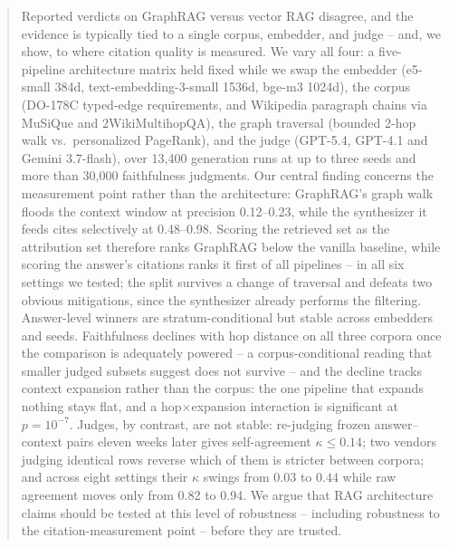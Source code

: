 \begin{abstract}
Reported verdicts on GraphRAG versus vector RAG disagree, and the
evidence is typically tied to a single corpus, embedder, and judge --
and, we show, to where citation quality is measured. We vary all four:
a five-pipeline architecture matrix held fixed while we swap the
embedder (e5-small 384d, text-embedding-3-small 1536d, bge-m3 1024d),
the corpus (DO-178C typed-edge requirements, and Wikipedia paragraph
chains via MuSiQue and 2WikiMultihopQA), the graph traversal (bounded
2-hop walk vs.\ personalized PageRank), and the judge (GPT-5.4, GPT-4.1
and Gemini 3.7-flash), over 13{,}400 generation runs at up to three
seeds and more than 30{,}000 faithfulness judgments. Our central finding concerns
the measurement point rather than the architecture: GraphRAG's graph
walk floods the context window at precision 0.12--0.23, while the
synthesizer it feeds cites selectively at 0.48--0.98. Scoring the
retrieved set as the attribution set therefore ranks GraphRAG below the
vanilla baseline, while scoring the answer's citations ranks it first of
all pipelines -- in all six settings we tested; the split survives a change of traversal and defeats
two obvious mitigations, since the synthesizer already performs the
filtering. Answer-level winners are stratum-conditional but stable
across embedders and seeds. Faithfulness declines with hop distance on all
three corpora once the comparison is adequately powered -- a
corpus-conditional reading that smaller judged subsets suggest does not survive --
and the decline tracks context expansion rather than the corpus: the one
pipeline that expands nothing stays flat, and a hop$\times$expansion
interaction is significant at $p{=}10^{-7}$. Judges,
by contrast, are not stable: re-judging frozen answer--context pairs
eleven weeks later gives self-agreement $\kappa{\leq}0.14$; two vendors
judging identical rows reverse which of them is stricter between
corpora; and across eight settings their $\kappa$ swings from $0.03$ to
$0.44$ while raw agreement moves only from 0.82 to 0.94. We argue that RAG
architecture claims should be tested at this level of robustness --
including robustness to the citation-measurement point -- before they
are trusted.

\end{abstract}
